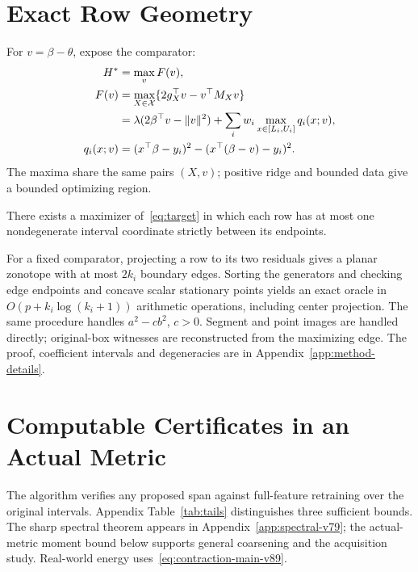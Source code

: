 \section{Exact Row Geometry}
For $v=\beta-\theta$, expose the comparator:
\begin{align}
 H^*&=\max_v F(v),\label{eq:dual}\\
 F(v)&=\max_{X\in\mathcal X}\{2g_X^\top v-v^\top M_Xv\}\nonumber\\
 &=\lambda(2\beta^\top v-\|v\|^2)
   +\sum_iw_i\max_{x\in[L_i,U_i]}q_i(x;v),\nonumber\\
 q_i(x;v)&=(x^\top\beta-y_i)^2-(x^\top(\beta-v)-y_i)^2.\nonumber
\end{align}
The maxima share the same pairs $(X,v)$; positive ridge and bounded data give a bounded optimizing region.
\begin{theorem}\label{thm:row}
There exists a maximizer of~\eqref{eq:target} in which each row has at most one nondegenerate interval coordinate strictly between its endpoints.
\end{theorem}
For a fixed comparator, projecting a row to its two residuals gives a planar zonotope with at most $2k_i$ boundary edges. Sorting the generators and checking edge endpoints and concave scalar stationary points yields an exact oracle in $O(p+k_i\log(k_i+1))$ arithmetic operations, including center projection. The same procedure handles $a^2-cb^2$, $c>0$. Segment and point images are handled directly; original-box witnesses are reconstructed from the maximizing edge. The proof, coefficient intervals and degeneracies are in Appendix~\ref{app:method-details}.

\section{Computable Certificates in an Actual Metric}
The algorithm verifies any proposed span against full-feature retraining over the original intervals. Appendix Table~\ref{tab:tails} distinguishes three sufficient bounds. The sharp spectral theorem appears in Appendix~\ref{app:spectral-v79}; the actual-metric moment bound below supports general coarsening and the acquisition study. Real-world energy uses~\eqref{eq:contraction-main-v89}.

